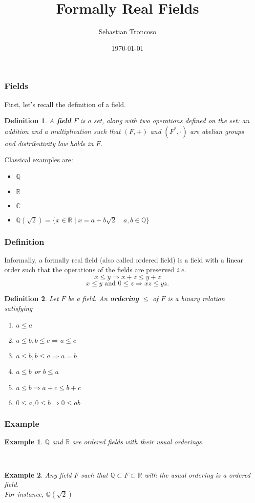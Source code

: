 \documentclass{beamer}
\title[Formally Real Fields.]{Formally Real Fields}
\author[Sebastian Troncoso]{Sebastian Troncoso}
\institute[BSC]{Birmingham-Southern College}
\date[ \today]{ \today \\ \vspace{1cm} }
\def\jump{ \quad \\ \vspace{0.5cm} \pause}
\def\CC{{\mathbb C}}
\def\QQ{{\mathbb Q}}
\def\RR{{\mathbb R}}
\theoremstyle{thmstyle}
\newtheorem*{mydef}{Definition}
\theoremstyle{mystyle}
\newtheorem*{myexample}{Example}
\theoremstyle{qstnstyle}
\begin{document}
\begin{frame}
\titlepage
\end{frame}

\begin{frame}[t]
\frametitle{Fields}
First, let's recall the definition of a field. \pause
\begin{mydef}
A \textbf{field} $F$ is a set, along with two operations defined on the set: an addition and a multiplication such that $(F,+)$ and $(F^{*},\cdot)$ are abelian groups and distributivity law holds in $F$. 
\end{mydef}

\pause

Classical examples are: 
\begin{itemize}
\item  $\QQ$ 

\item $\RR$ 

\item $\CC$
\pause

\item $\QQ(\sqrt{2})=\{x\in \RR \mid x=a+b\sqrt{2} \quad a,b\in \QQ \}$
\end{itemize}
\end{frame}

\begin{frame}[t]
\frametitle{Definition}
Informally, a formally real field (also called ordered field) is a field with a linear order such that the operations of the fields are preserved \emph{i.e.}
$$x\leq y \Longrightarrow x+z\leq y+z $$
$$x\leq y \mbox{ and } 0\leq z \Longrightarrow xz\leq yz.$$

\pause
\begin{mydef}
Let $F$ be a field. An \textbf{ordering} $\leq$ of $F$ is a binary relation satisfying
\begin{enumerate}
\item $a\leq a$
\item $a\leq b, b\leq c \Longrightarrow a\leq c$
\item $a\leq b, b\leq a \Longrightarrow a=b$
\item $a\leq b$ or $b\leq a$
\item $a\leq b \Longrightarrow a+c \leq b+c$
\item $0\leq a, 0\leq b \Longrightarrow 0\leq ab$
\end{enumerate}
\end{mydef}
\end{frame}

\begin{frame}[t]
\frametitle{Example}
\begin{myexample}
$\QQ$ and $\RR$ are ordered fields with their usual orderings. 
\end{myexample}

\jump

\begin{myexample}
Any field $F$ such that $\QQ \subset F \subset \RR$ with the usual ordering is a ordered field.\jump For instance, $\QQ(\sqrt{2})$ 
\end{myexample}


\end{frame}
\end{document}
